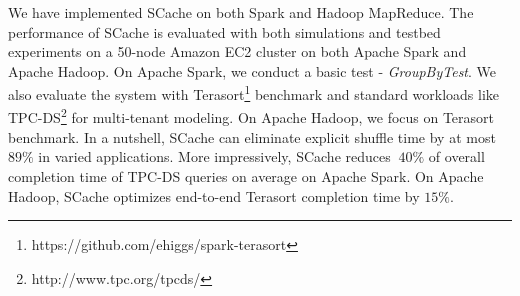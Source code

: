 {\color{black}
We have implemented SCache on both Spark and Hadoop MapReduce. 
The performance of SCache is evaluated with both simulations and testbed experiments on a 50-node Amazon EC2 cluster on both Apache Spark and Apache Hadoop. On Apache Spark, we conduct a basic test - \textit{GroupByTest}. We also evaluate the system with Terasort\footnote{https://github.com/ehiggs/spark-terasort} benchmark and standard workloads like TPC-DS\footnote{http://www.tpc.org/tpcds/} for multi-tenant modeling. On Apache Hadoop, we focus on Terasort benchmark. In a nutshell, SCache can eliminate explicit shuffle time by at most $89\%$ in varied applications. More impressively, SCache reduces $~40\%$ of overall completion time of TPC-DS queries on average on Apache Spark. On Apache Hadoop, SCache optimizes end-to-end Terasort completion time by $15\%$.
}
